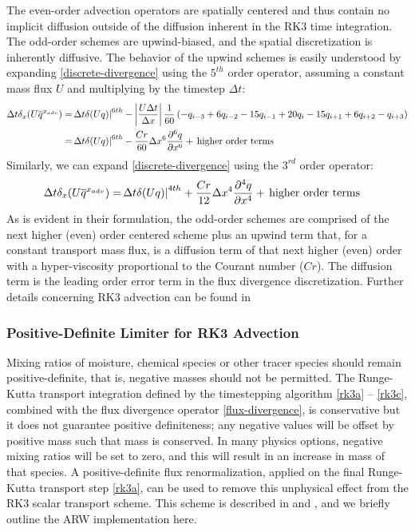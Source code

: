 The even-order advection operators are spatially centered and thus
contain no implicit diffusion outside of the diffusion inherent in
the RK3 time integration.  The odd-order schemes are upwind-biased, and
the spatial discretization is inherently diffusive.  The behavior of 
the upwind schemes is easily understood by expanding
\eqref{discrete-divergence} using the $5^{th}$ order operator, assuming a
constant mass flux $U$ and
multiplying by the timestep $\Delta t$:
%
\begin{align}
\Delta t \delta_x (U \overline{q}^{x_{adv}}) =  
& \, {\Delta t} {\delta (Uq)|}^{6th}
-\left| {U \Delta t \over \Delta x }\right| {1 \over 60}
\left(-q_{i-3}+6q_{i-2}-15q_{i-1}+20q_{i}-15q_{i+1}+6q_{i+2}-q_{i+3}
\right)
\notag
\\
= & \, {\Delta t} {\delta (Uq)|}^{6th} - {Cr \over 60} \Delta x^6 {\partial^6
q \over \partial x^6} + \, {\rm higher\ order\ terms}
\notag
\end{align}
%
\noindent
Similarly, we can expand \eqref{discrete-divergence} using the $3^{rd}$
order operator:
\begin{align}
\Delta t \delta_x (U \overline{q}^{x_{adv}})
= & \, {\Delta t} {\delta (Uq)|}^{4th} + {Cr \over 12} \Delta x^4 {\partial^4
q \over \partial x^4} + \, {\rm higher\ order\ terms}
\notag
\end{align}
%
\noindent
As is evident in
their formulation, the odd-order schemes are comprised of the next
higher (even) order centered scheme plus an upwind term that, for a
constant transport mass flux, is a diffusion term of that next higher
(even) order with a hyper-viscosity proportional to the Courant number
($Cr$).
The diffusion term is the leading order error term in the flux
divergence discretization.
Further details concerning RK3 advection can be found in \citet{wicker02}

\subsubsection{Positive-Definite Limiter for RK3 Advection}
\label{positive-definite-transport}

Mixing ratios of moisture, chemical species or other tracer species
should remain positive-definite, that is, negative masses should not be
permitted.  The Runge-Kutta transport integration defined by the
timestepping algorithm \eqref{rk3a} -- \eqref{rk3c}, combined with the
flux divergence operator \eqref{flux-divergence}, is conservative but it
does not guarantee positive definiteness; any negative values will be
offset by positive mass such that mass is conserved.  In many physics
options, negative mixing ratios will be set to zero, and this will
result in an increase in mass of that species.  A positive-definite flux
renormalization, applied on the final Runge-Kutta transport step
\eqref{rk3a}, can be used to remove this unphysical effect from the RK3
scalar transport scheme.  This scheme is described in
\citet{skamarock-weisman-08} and \citet{skamarock2005}, and we briefly
outline the ARW implementation here.


